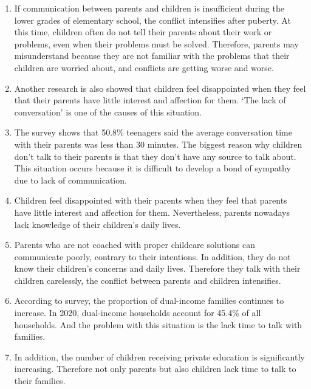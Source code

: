\documentclass[conference]{IEEEtran}
\begin{document}
\begin{enumerate}
  \item If communication between parents and children is insufficient during the lower grades of elementary school, the conflict intensifies after puberty. At this time, children often do not tell their parents about their work or problems, even when their problems must be solved. Therefore, parents may misunderstand because they are not familiar with the problems that their children are worried about, and conflicts are getting worse and worse. 
  
  \item Another research is also showed that children feel disappointed when they feel that their parents have little interest and affection for them. ‘The lack of conversation’ is one of the causes of this situation.
  
  \item The survey shows that 50.8\% teenagers said the average conversation time with their parents was less than 30 minutes. The biggest reason why children don't talk to their parents is that they don't have any source to talk about. This situation occurs because it is difficult to develop a bond of sympathy due to lack of communication.
  
  \item Children feel disappointed with their parents when they feel that parents have little interest and affection for them. Nevertheless, parents nowadays lack knowledge of their children's daily lives.

  \item Parents who are not coached with proper childcare solutions can communicate poorly, contrary to their intentions. In addition, they do not know their children's concerns and daily lives. Therefore they talk with their children carelessly, the conflict between parents and children intensifies.
  
  \item According to survey, the proportion of dual-income families continues to increase. In 2020, dual-income households account for 45.4\% of all households. And the problem with this situation is the lack time to talk with families.
  
  \item In addition, the number of children receiving private education is significantly increasing. Therefore not only parents but also children lack time to talk to their families.
  
\end{enumerate}
\end{document}
